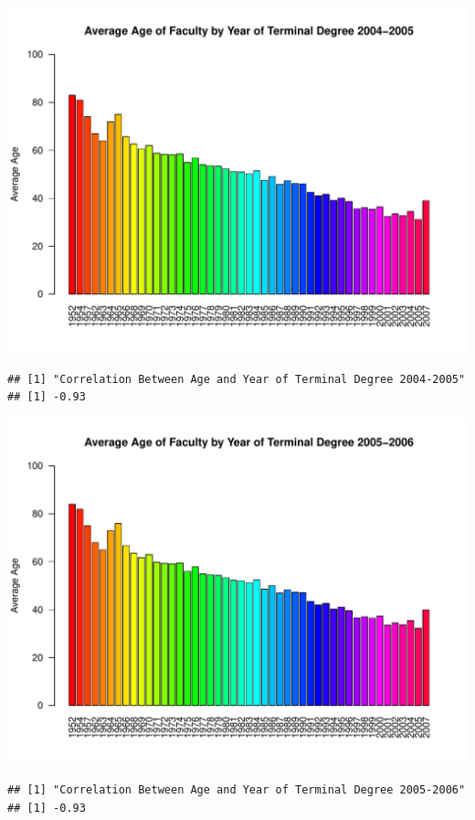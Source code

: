 \documentclass[12pt,a4paper]{article}\usepackage[]{graphicx}\usepackage[]{color}
\makeatletter
\def\maxwidth{ %
  \ifdim\Gin@nat@width>\linewidth
    \linewidth
  \else
    \Gin@nat@width
  \fi
}
\newenvironment{kframe}{%
 \def\at@end@of@kframe{}%
 \ifinner\ifhmode%
  \def\at@end@of@kframe{\end{minipage}}%
  \begin{minipage}{\columnwidth}%
 \fi\fi%
 \def\FrameCommand##1{\hskip\@totalleftmargin \hskip-\fboxsep
 \colorbox{shadecolor}{##1}\hskip-\fboxsep
     \hskip-\linewidth \hskip-\@totalleftmargin \hskip\columnwidth}%
 \MakeFramed {\advance\hsize-\width
   \@totalleftmargin\z@ \linewidth\hsize
   \@setminipage}}%
 {\par\unskip\endMakeFramed%
 \at@end@of@kframe}
\newenvironment{knitrout}{}{} %
\theoremstyle{definition}
\makeatother
\begin{document}
\begin{knitrout}
\color{fgcolor}
\includegraphics[width=\maxwidth]{figure/unnamed-chunk-11-1} 
\begin{kframe}\begin{verbatim}
## [1] "Correlation Between Age and Year of Terminal Degree 2004-2005"
## [1] -0.93
\end{verbatim}
\end{kframe}
\includegraphics[width=\maxwidth]{figure/unnamed-chunk-11-2} 
\begin{kframe}\begin{verbatim}
## [1] "Correlation Between Age and Year of Terminal Degree 2005-2006"
## [1] -0.93

\end{verbatim}
\end{kframe}
\end{knitrout}
\end{document}
